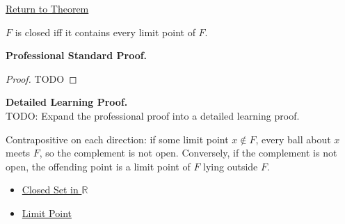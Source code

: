 \newpage
{}
\label{prf:closed-iff-contains-limit-points}

\begin{remark*}[Return]
\hyperref[thm:closed-iff-contains-limit-points]{Return to Theorem}
\end{remark*}

\begin{theorem*}
$F$ is closed iff it contains every limit point of $F$.
\end{theorem*}

\textbf{Professional Standard Proof.}~\\
\begin{proof}
TODO
\end{proof}

\textbf{Detailed Learning Proof.}~\\
TODO: Expand the professional proof into a detailed learning proof.

\begin{remark*}
Contrapositive on each direction: if some limit point $x\notin F$, every ball about $x$ meets $F$, so the complement is not open. Conversely, if the complement is not open, the offending point is a limit point of $F$ lying outside $F$.
\end{remark*}

\begin{dependencies}
\begin{itemize}
  \item \hyperref[def:closed-set]{Closed Set in $\mathbb{R}$}
  \item \hyperref[def:limit-point]{Limit Point}
\end{itemize}
\end{dependencies}
